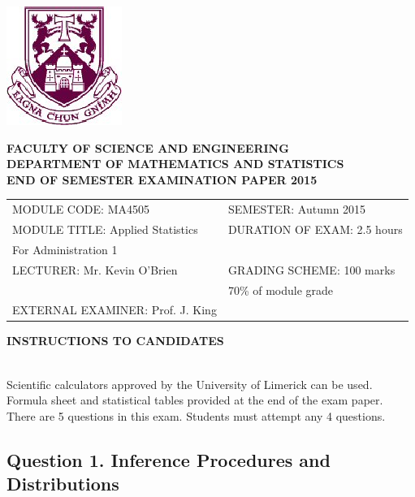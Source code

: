 \documentclass[a4paper,12pt]{article}
\begin{document}
	\begin{center}
		\includegraphics[scale=0.55]{images/shieldtransparent2}
	\end{center}
	
	\begin{center}
		\vspace{1cm}
		\large \bf {FACULTY OF SCIENCE AND ENGINEERING} \\[0.5cm]
		\normalsize DEPARTMENT OF MATHEMATICS AND STATISTICS \\[1.25cm]
		\large \bf {END OF SEMESTER EXAMINATION PAPER 2015} \\[1.5cm]
	\end{center}
	
	\begin{tabular}{ll}
		MODULE CODE: MA4505 & SEMESTER: Autumn 2015 \\[1cm]
		MODULE TITLE: Applied Statistics & DURATION OF EXAM: 2.5 hours  \\
		\phantom{MODULE TITLE:} For Administration 1 & \\ [1cm]
		LECTURER: Mr. Kevin O'Brien & GRADING SCHEME: 100 marks \\
		& \phantom{GRADING SCHEME:} \footnotesize {70\% of module grade} \\[1cm]
EXTERNAL EXAMINER: Prof. J. King & \\
	\end{tabular}
\vspace{0.3cm}
	\begin{center}
		{\bf INSTRUCTIONS TO CANDIDATES}
	\end{center}
	
	{\noindent \\ Scientific calculators approved by the University of Limerick can be used. \\
		Formula sheet and statistical tables provided at the end of the exam paper.\\
		There are 5 questions in this exam. Students must attempt any 4 questions.}
	\newpage
	\subsection*{Question 1. Inference Procedures and Distributions}
	
\end{document}
